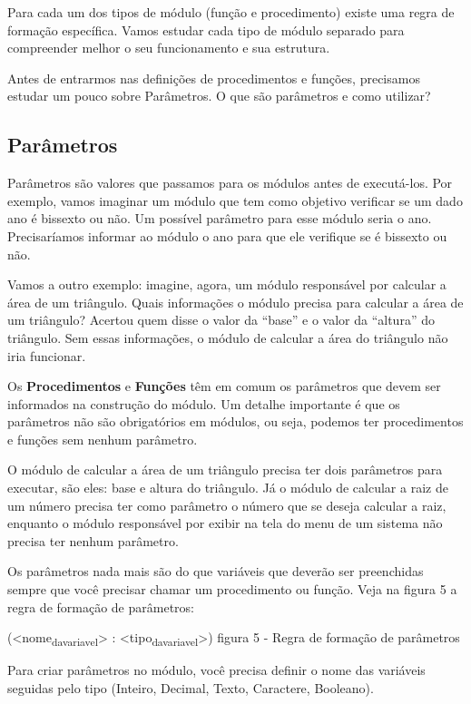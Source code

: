 \documentclass[11pt]{article}
\begin{document}
Para cada um dos tipos de módulo (função e procedimento) existe uma regra de formação específica. Vamos estudar cada tipo de módulo separado para compreender melhor o seu funcionamento e sua estrutura.

Antes de entrarmos nas definições de procedimentos e funções, precisamos estudar um pouco sobre Parâmetros. O que são parâmetros e como utilizar? 

\subsection{Parâmetros}
\label{sec:orge016c20}

Parâmetros são valores que passamos para os módulos antes de executá-los. Por exemplo, vamos imaginar um módulo que tem como objetivo verificar se um dado ano é bissexto ou não. Um possível parâmetro para esse módulo seria o ano. Precisaríamos informar ao módulo o ano para que ele verifique se é bissexto ou não.

Vamos a outro exemplo: imagine, agora, um módulo responsável por calcular a área de um triângulo. Quais informações o módulo precisa para calcular a área de um triângulo? Acertou quem disse o valor da “base” e o valor da “altura” do triângulo. Sem essas informações, o módulo de calcular a área do triângulo não iria funcionar.

Os \textbf{Procedimentos} e \textbf{Funções} têm em comum os parâmetros que devem ser informados na construção do módulo. Um detalhe importante é que os parâmetros não são obrigatórios em módulos, ou seja, podemos ter procedimentos e funções sem nenhum parâmetro.

O módulo de calcular a área de um triângulo precisa ter dois parâmetros para executar, são eles: base e altura do triângulo. Já o módulo de calcular a raiz de um número precisa ter como parâmetro o número que se deseja calcular a raiz, enquanto o módulo responsável por exibir na tela do menu de um sistema não precisa ter nenhum parâmetro.

Os parâmetros nada mais são do que variáveis que deverão ser preenchidas sempre que você precisar chamar um procedimento ou função. Veja na figura 5 a regra de formação de parâmetros:

(<nome\textsubscript{da}\textsubscript{variavel}> : <tipo\textsubscript{da}\textsubscript{variavel}>)
    figura 5 - Regra de formação de parâmetros

Para criar parâmetros no módulo, você precisa definir o nome das variáveis seguidas pelo tipo (Inteiro, Decimal, Texto, Caractere, Booleano).
\end{document}
